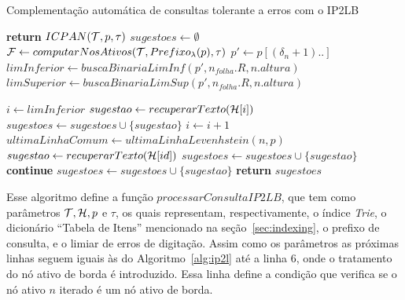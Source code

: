 \begin{algorithm}[H]
\caption{Complementação automática de consultas tolerante a erros com o IP2LB}\label{alg:ip2lb}
\begin{algorithmic}[1]
     \textbf{return} $ICPAN(\mathcal{T},p,\tau)$
    \EndIf
    \State $sugestoes \leftarrow \emptyset$
    \State $\mathcal{F} \leftarrow computarNosAtivos(\mathcal{T}, Prefixo_{\lambda}(p), \tau)$ 
         
         
                \State $p' \gets p[(\delta_{n} + 1)..]$
                \State $limInferior \gets buscaBinariaLimInf(p', n_{folha}.R, n.altura)$
                \State $limSuperior \gets buscaBinariaLimSup(p', n_{folha}.R, n.altura)$
                
                    \State $i \gets limInferior$
                        \State $sugestao \leftarrow recuperarTexto(\mathcal{H}[i])$
                        \State $sugestoes \gets sugestoes \cup \{ sugestao \} $
                        \State $i \gets i + 1$
                    \EndWhile
                \EndIf
            \EndFor
        \Else {}
            \State $ultimaLinhaComum \leftarrow ultimaLinhaLevenhstein(n, p)$
                    \State $sugestao \leftarrow recuperarTexto(\mathcal{H}[id])$
                        \State $sugestoes \leftarrow sugestoes \cup \{ sugestao \}$
                        \State \textbf{continue}
                    \EndIf
                        \State $sugestoes \leftarrow sugestoes \cup \{ sugestao \}$
                    \EndIf
                \EndFor
            \EndFor
        \EndIf
    \EndFor
    \State \textbf{return} $sugestoes$
\EndFunction
\end{algorithmic}
\end{algorithm}

Esse algoritmo define a função $processarConsultaIP2LB$, que tem como parâmetros $\mathcal{T}, \mathcal{H}, p$ e $\tau$, os quais representam, respectivamente, o índice \textit{Trie}, o dicionário ``Tabela de Itens'' mencionado na seção~\ref{sec:indexing}, o prefixo de consulta, e o limiar de erros de digitação. Assim como os parâmetros as próximas linhas seguem iguais às do Algoritmo~\ref{alg:ip2l} até a linha 6, onde o tratamento do nó ativo de borda é introduzido. Essa linha define a condição que verifica se o nó ativo $n$ iterado é um nó ativo de borda.

